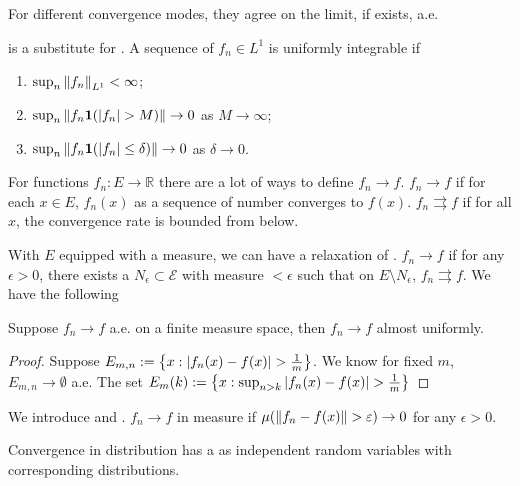 \begin{proposition}
    For different convergence modes, they agree on the limit, if exists, a.e. 
\end{proposition}

 is a substitute for . A sequence of \(f_{n} \in L^{1}\) is uniformly integrable if
\begin{enumerate}
    \item \(\sup_{n} \norm{f_{n}}_{L^{1}} < \infty\);
    \item \(\sup_{n} \norm{f_{n} \mathbf{1}(\abs{f_{n}}> M)} \to 0\) as \(M \to \infty\);
    \item \(\sup_{n} \norm{f_{n} \mathbf{1}(\abs{f_{n}}\leq \delta)} \to 0\) as \(\delta \to 0\).
\end{enumerate} 

For functions \(f_{n}: E \to \mathbb{R}\) there are a lot of ways to define \(f_{n} \to f\). 
\(f_{n} \to f\)  if for each \(x \in E\), \(f_{n}(x)\) as a sequence of number converges to \(f(x)\). \(f_{n} \rightrightarrows f\) if for all \(x\), the convergence rate is bounded from below. 

With \(E\) equipped with a measure, we can have a relaxation of . \(f_{n} \to f\)  if for any \(\epsilon> 0\), there exists a \(N_{\epsilon} \subset \mathcal{E}\) with measure \(< \epsilon\) such that on \(E\setminus N_{\epsilon}\), \(f_{n} \rightrightarrows f\). We have the following
\begin{thm}
    Suppose \(f_{n} \to f\) a.e. on a finite measure space, then \(f_{n} \to f\) almost uniformly. 
\end{thm}
\begin{proof}
    Suppose \(E_{m,n} := \Bqty{x: \abs{f_{n}(x) - f(x)} > \frac{1}{m}}\). We know for fixed \(m\), \(E_{m,n} \to \emptyset\) a.e. The set \(E_{m}(k):= \Bqty{x: \sup_{n > k} \abs{f_{n}(x) - f(x)} > \frac{1}{m}} \)  
\end{proof}

We introduce  and . \(f_{n} \to f\) in measure if \(\mu\pqty{\norm{f_{n} - f(x)} > \epsilon} \to 0\) for any \(\epsilon > 0\).

Convergence in distribution has a  as independent random variables with corresponding distributions. 

